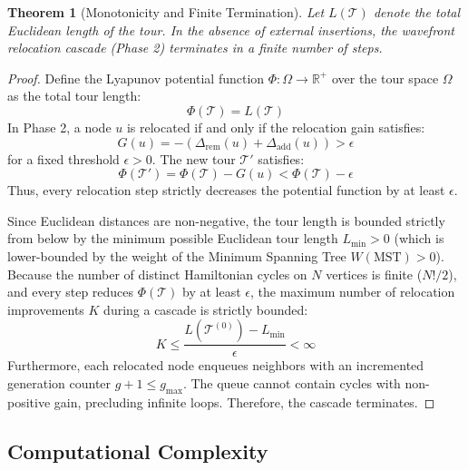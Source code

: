 \documentclass[11pt,a4paper]{article}
\newtheorem{theorem}{Theorem}
\theoremstyle{definition}
\begin{document}
\begin{theorem}[Monotonicity and Finite Termination]
Let $L(\mathcal{T})$ denote the total Euclidean length of the tour. In the absence of external insertions, the wavefront relocation cascade (Phase 2) terminates in a finite number of steps.
\end{theorem}
\begin{proof}
Define the Lyapunov potential function $\Phi: \Omega \to \mathbb{R}^+$ over the tour space $\Omega$ as the total tour length:
\begin{equation}
\Phi(\mathcal{T}) = L(\mathcal{T})
\end{equation}
In Phase 2, a node $u$ is relocated if and only if the relocation gain satisfies:
\begin{equation}
G(u) = -(\Delta_{\text{rem}}(u) + \Delta_{\text{add}}(u)) > \epsilon
\end{equation}
for a fixed threshold $\epsilon > 0$. The new tour $\mathcal{T}'$ satisfies:
\begin{equation}
\Phi(\mathcal{T}') = \Phi(\mathcal{T}) - G(u) < \Phi(\mathcal{T}) - \epsilon
\end{equation}
Thus, every relocation step strictly decreases the potential function by at least $\epsilon$.

Since Euclidean distances are non-negative, the tour length is bounded strictly from below by the minimum possible Euclidean tour length $L_{\min} > 0$ (which is lower-bounded by the weight of the Minimum Spanning Tree $W(\text{MST}) > 0$). Because the number of distinct Hamiltonian cycles on $N$ vertices is finite ($N!/2$), and every step reduces $\Phi(\mathcal{T})$ by at least $\epsilon$, the maximum number of relocation improvements $K$ during a cascade is strictly bounded:
\begin{equation}
K \le \frac{L(\mathcal{T}^{(0)}) - L_{\min}}{\epsilon} < \infty
\end{equation}
Furthermore, each relocated node enqueues neighbors with an incremented generation counter $g + 1 \le g_{\max}$. The queue cannot contain cycles with non-positive gain, precluding infinite loops. Therefore, the cascade terminates.
\end{proof}

\subsection{Computational Complexity}
\end{document}
